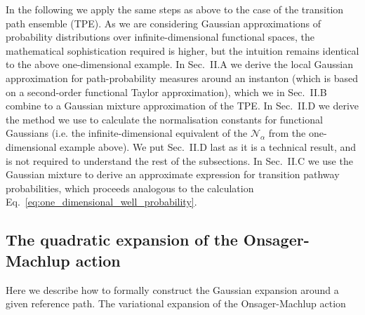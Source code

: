 In the following we apply the same steps as above to the case of the
transition path ensemble (TPE). As we are considering Gaussian approximations
of probability distributions over infinite-dimensional functional
spaces, the mathematical sophistication required is higher, but the
intuition remains identical to the above one-dimensional example.
In Sec.~II.A we derive the local Gaussian approximation for path-probability
measures around an instanton (which is based on a second-order functional
Taylor approximation), which we in Sec.~II.B combine to a Gaussian
mixture approximation of the TPE. In Sec.~II.D we derive the method
we use to calculate the normalisation constants for functional Gaussians
(i.e. the infinite-dimensional equivalent of the $\mathcal{N}_{\alpha}$
from the one-dimensional example above). We put Sec.~II.D last as
it is a technical result, and is not required to understand the rest
of the subsections. In Sec.~II.C we use the Gaussian mixture to derive
an approximate expression for transition pathway probabilities, which
proceeds analogous to the calculation Eq.~\eqref{eq:one_dimensional_well_probability}.

\subsection{The quadratic expansion of the Onsager-Machlup action}

Here we describe how to formally construct the Gaussian expansion
around a given reference path. The variational expansion of the Onsager-Machlup
action


